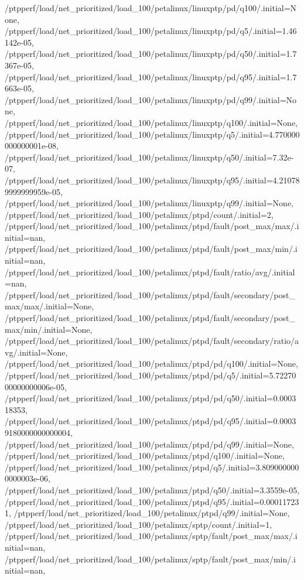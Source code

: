 {    /ptpperf/load/net_prioritized/load_100/petalinux/linuxptp/pd/q100/.initial=None,
    /ptpperf/load/net_prioritized/load_100/petalinux/linuxptp/pd/q5/.initial=1.46142e-05,
    /ptpperf/load/net_prioritized/load_100/petalinux/linuxptp/pd/q50/.initial=1.7367e-05,
    /ptpperf/load/net_prioritized/load_100/petalinux/linuxptp/pd/q95/.initial=1.7663e-05,
    /ptpperf/load/net_prioritized/load_100/petalinux/linuxptp/pd/q99/.initial=None,
    /ptpperf/load/net_prioritized/load_100/petalinux/linuxptp/q100/.initial=None,
    /ptpperf/load/net_prioritized/load_100/petalinux/linuxptp/q5/.initial=4.770000000000001e-08,
    /ptpperf/load/net_prioritized/load_100/petalinux/linuxptp/q50/.initial=7.32e-07,
    /ptpperf/load/net_prioritized/load_100/petalinux/linuxptp/q95/.initial=4.210789999999959e-05,
    /ptpperf/load/net_prioritized/load_100/petalinux/linuxptp/q99/.initial=None,
    /ptpperf/load/net_prioritized/load_100/petalinux/ptpd/count/.initial=2,
    /ptpperf/load/net_prioritized/load_100/petalinux/ptpd/fault/post_max/max/.initial=nan,
    /ptpperf/load/net_prioritized/load_100/petalinux/ptpd/fault/post_max/min/.initial=nan,
    /ptpperf/load/net_prioritized/load_100/petalinux/ptpd/fault/ratio/avg/.initial=nan,
    /ptpperf/load/net_prioritized/load_100/petalinux/ptpd/fault/secondary/post_max/max/.initial=None,
    /ptpperf/load/net_prioritized/load_100/petalinux/ptpd/fault/secondary/post_max/min/.initial=None,
    /ptpperf/load/net_prioritized/load_100/petalinux/ptpd/fault/secondary/ratio/avg/.initial=None,
    /ptpperf/load/net_prioritized/load_100/petalinux/ptpd/pd/q100/.initial=None,
    /ptpperf/load/net_prioritized/load_100/petalinux/ptpd/pd/q5/.initial=5.7227000000000006e-05,
    /ptpperf/load/net_prioritized/load_100/petalinux/ptpd/pd/q50/.initial=0.000318353,
    /ptpperf/load/net_prioritized/load_100/petalinux/ptpd/pd/q95/.initial=0.00039180000000000004,
    /ptpperf/load/net_prioritized/load_100/petalinux/ptpd/pd/q99/.initial=None,
    /ptpperf/load/net_prioritized/load_100/petalinux/ptpd/q100/.initial=None,
    /ptpperf/load/net_prioritized/load_100/petalinux/ptpd/q5/.initial=3.8090000000000003e-06,
    /ptpperf/load/net_prioritized/load_100/petalinux/ptpd/q50/.initial=3.3559e-05,
    /ptpperf/load/net_prioritized/load_100/petalinux/ptpd/q95/.initial=0.000117231,
    /ptpperf/load/net_prioritized/load_100/petalinux/ptpd/q99/.initial=None,
    /ptpperf/load/net_prioritized/load_100/petalinux/sptp/count/.initial=1,
    /ptpperf/load/net_prioritized/load_100/petalinux/sptp/fault/post_max/max/.initial=nan,
    /ptpperf/load/net_prioritized/load_100/petalinux/sptp/fault/post_max/min/.initial=nan,
}
